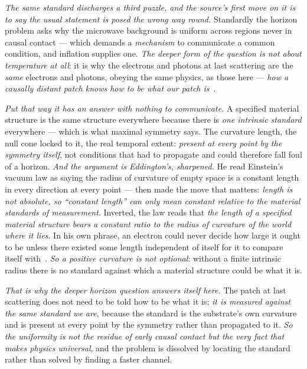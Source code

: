 \documentclass[11pt,a4paper]{article}
\theoremstyle{plain}
\theoremstyle{definition}
\begin{document}
\emph{The same standard discharges a third puzzle, and the source's first move on it is to say the usual
statement is posed the wrong way round.} Standardly the horizon problem asks why the microwave background is
uniform across regions never in causal contact --- which demands a \emph{mechanism} to communicate a common
condition, and inflation supplies one. \emph{The deeper form of the question is not about temperature at
all}: it is why the electrons and photons at last scattering are the \emph{same} electrons and photons,
obeying the same physics, as those here --- \emph{how a causally distant patch knows how to be what our patch
is}~\cite{JanzenGeometricCore}.

\emph{Put that way it has an answer with nothing to communicate.} A specified material structure is the same
structure everywhere because there is \emph{one intrinsic standard} everywhere --- which is what maximal
symmetry says. The curvature length, the null cone locked to it, the real temporal extent: \emph{present at
every point by the symmetry itself}, not conditions that had to propagate and could therefore fall foul of a
horizon. \emph{And the argument is Eddington's, sharpened.} He read Einstein's vacuum law as saying the radius of
curvature of empty space is a constant length in every direction at every point --- then made the move that
matters: \emph{length is not absolute, so ``constant length'' can only mean constant relative to the material
standards of measurement}. Inverted, the law reads that \emph{the length of a specified material structure
bears a constant ratio to the radius of curvature of the world where it lies}. In his own phrase, an
electron could never decide how large it ought to be unless there existed some length independent of itself
for it to compare itself with~\cite{JanzenGeometricCore}. \emph{So a positive curvature is not optional}:
without a finite intrinsic radius there is no standard against which a material structure could be what it
is.

\emph{That is why the deeper horizon question answers itself here.} The patch at last scattering does not
need to be told how to be what it is; \emph{it is measured against the same standard we are}, because the
standard is the substrate's own curvature and is present at every point by the symmetry rather than
propagated to it. \emph{So the uniformity is not the residue of early causal contact but the very fact that
makes physics universal}, and the problem is dissolved by locating the standard rather than
solved by finding a faster channel.
\end{document}
